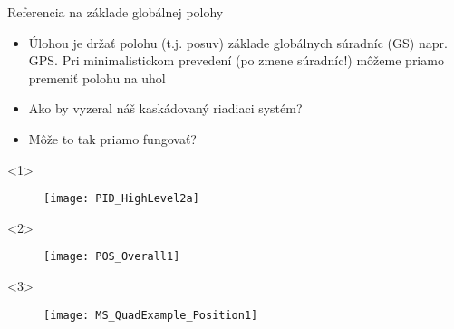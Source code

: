

  \begin{frame}[t]{Referencia na základe globálnej polohy}
\begin{itemize}
  \item<1-> Úlohou je držať polohu (t.j. posuv) základe globálnych súradníc (GS) napr. GPS. Pri minimalistickom prevedení (po zmene súradníc!) môžeme priamo premeniť polohu na uhol
  \item<2-> Ako by vyzeral náš kaskádovaný riadiaci systém?
  \item<3-> Môže to tak priamo fungovať?
\end{itemize}

  \begin{onlyenv}<1>
  \begin{figure}
\centering
  \texttt{[image: PID\_HighLevel2a]}\\
\end{figure}
\end{onlyenv}

  \begin{onlyenv}<2>
  \begin{figure}
\centering
  \texttt{[image: POS\_Overall1]}\\
\end{figure}
\end{onlyenv}

  \begin{onlyenv}<3>
  \begin{figure}
\centering
  \texttt{[image: MS\_QuadExample\_Position1]}\\
\end{figure}
\end{onlyenv}
\end{frame}


